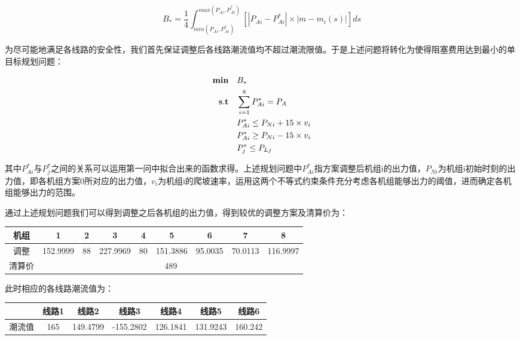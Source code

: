 \documentclass[12pt,a4paper]{ctexart}
\begin{document}
		\begin{equation}
		B_{*}=\dfrac{1}{4} \int_{min{(P_{Ai},P_{Ai}^{*})}}^{max{(P_{Ai},P_{Ai}^{*})}} [|P_{Ai}-P_{Ai}^{*}|\times |m-m_{i}(s)|] ds
		\label{1}
		\end{equation}
	
	为尽可能地满足各线路的安全性，我们首先保证调整后各线路潮流值均不超过潮流限值。于是上述问题将转化为使得阻塞费用达到最小的单目标规划问题：
	
	\begin{equation*}
		\begin{split}
			{\bf min}\quad & B_{*}\\
			{\bf s.t}\quad &\sum_{i=1}^{8}P_{Ai}^{*} = P_{A}\\
			&P_{Ai}^{*} \le P_{Ni} + 15\times v_{i} \\
			&P_{Ai}^{*} \ge P_{Ni} - 15\times v_{i} \\
			&P_{j}^{*} \le P_{Lj} \\
		\end{split}
	\end{equation*}
	
	其中$P_{Ai}^{*}$与$P_{j}^{*}$之间的关系可以运用第一问中拟合出来的函数求得。上述规划问题中$P_{Ai}^{*}$指方案调整后机组i的出力值，$P_{Ni}$为机组i初始时刻的出力值，即各机组方案0所对应的出力值，$v_{i}$为机组i的爬坡速率，运用这两个不等式约束条件充分考虑各机组能够出力的阈值，进而确定各机组能够出力的范围。
	
	通过上述规划问题我们可以得到调整之后各机组的出力值，得到较优的调整方案及清算价为：
		\begin{table}[htbp]
		\begin{tabular}{|c|c|c|c|c|c|c|c|c|}
			\hline
			{机组} & {1} & {2} & {3} & {4} & {5} & {6} & {7} & {8} \\
			\hline
			{调整} & 152.9999     & 88           & 227.9969     & 80           & 151.3886     & 95.0035      & 70.0113      & 116.9997 \\
			\hline
			{清算价} & \multicolumn{8}{c|}{489}                                                                                              \\ \hline 
		\end{tabular}
	\end{table}

	此时相应的各线路潮流值为：
	
	
	\vspace{1em}
	
	\begin{adjustbox}{center}
		\begin{tabular}{|c|c|c|c|c|c|c|}
			\hline
			\centering
			& {线路1} & {线路2} & {线路3} &{线路4} & {线路5} &{线路6} \\ \hline
			{潮流值} & 165          & 149.4799     & -155.2802    & 126.1841     & 131.9243     & 160.242      \\ \hline
		\end{tabular}
	\end{adjustbox}
\end{document}

